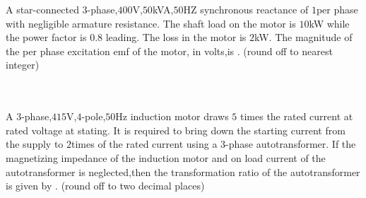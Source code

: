 \begin{figure}[!ht]
\centering
{}%

\end{figure} 

\item A star-connected $3$-phase,$400$V,$50$kVA,$50$HZ synchronous reactance of $1$\ohm per phase with negligible armature resistance. The shaft load on the motor is $10$kW while the power factor is $0.8$ leading. The loss in the motor is $2$kW. The magnitude of the per phase excitation emf of the motor, in volts,is \underline{\hspace{2cm}}. (round off to nearest integer) \\ \\ \\

\item A $3$-phase,$415$V,$4$-pole,$50$Hz induction motor draws $5$ times the rated current at rated voltage at stating. It is required to bring down the starting current from the supply to $2$times of the rated current using a $3$-phase autotransformer. If the magnetizing impedance of the induction motor and on load current of the autotransformer is neglected,then the transformation ratio of the autotransformer is given by \underline{\hspace{2cm}}. (round off to two decimal places)  










































